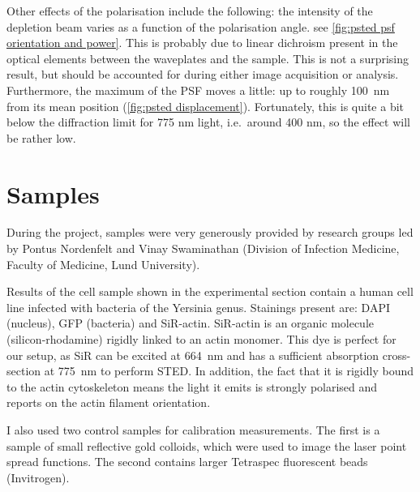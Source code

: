 Other effects of the polarisation include the following: the intensity of the depletion beam varies as a function of the polarisation angle. see \autoref{fig:psted psf orientation and power}. This is probably due to linear dichroism present in the optical elements between the waveplates and the sample. This is not a surprising result, but should be accounted for during either image acquisition or analysis. Furthermore, the maximum of the PSF moves a little: up to roughly 100~nm from its mean position (\autoref{fig:psted displacement}). Fortunately, this is quite a bit below the diffraction limit for 775 nm light, i.e.~around 400 nm, so the effect will be rather low.

\section{Samples}
\label{sec:samples}

During the project, samples were very generously provided by research groups led by Pontus Nordenfelt and Vinay Swaminathan (Division of Infection Medicine, Faculty of Medicine, Lund University).

Results of the cell sample shown in the experimental section contain a human cell line infected with bacteria of the Yersinia genus. Stainings present are: DAPI (nucleus), GFP (bacteria) and SiR-actin. SiR-actin is an organic molecule (silicon-rhodamine) rigidly linked to an actin monomer. This dye is perfect for our setup, as SiR can be excited at 664~nm and has a sufficient absorption cross-section at 775~nm to perform STED. In addition, the fact that it is rigidly bound to the actin cytoskeleton means the light it emits is strongly polarised and reports on the actin filament orientation.

I also used two control samples for calibration measurements. The first is a sample of small  reflective gold colloids, which were used to image the laser point spread functions. The second contains larger Tetraspec fluorescent beads (Invitrogen).

